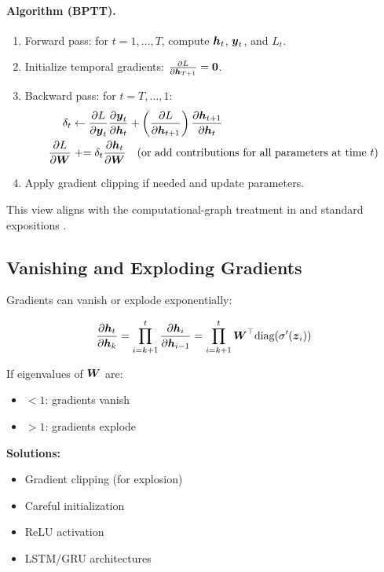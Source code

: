 \paragraph{Algorithm (BPTT).}
\begin{enumerate}[nosep]
    \item Forward pass: for $t=1,\dots,T$, compute $\boldsymbol{h}_t$, $\boldsymbol{y}_t$, and $L_t$.
    \item Initialize temporal gradients: $\frac{\partial L}{\partial \boldsymbol{h}_{T+1}}=\boldsymbol{0}$.
    \item Backward pass: for $t=T,\dots,1$:
    \begin{align*}
        \delta_t &\leftarrow \frac{\partial L}{\partial \boldsymbol{y}_t} \frac{\partial \boldsymbol{y}_t}{\partial \boldsymbol{h}_t} + \left(\frac{\partial L}{\partial \boldsymbol{h}_{t+1}}\right) \frac{\partial \boldsymbol{h}_{t+1}}{\partial \boldsymbol{h}_t} \\
        \frac{\partial L}{\partial \boldsymbol{W}} &\mathrel{+}= \delta_t \frac{\partial \boldsymbol{h}_t}{\partial \boldsymbol{W}} \quad (\text{or add contributions for all parameters at time } t)
    \end{align*}
    \item Apply gradient clipping if needed and update parameters.
\end{enumerate}

This view aligns with the computational-graph treatment in \cite{GoodfellowEtAl2016} and standard expositions \cite{WebDLBRNN,D2LChapterRNN}.

\subsection{Vanishing and Exploding Gradients}

Gradients can vanish or explode exponentially:

\begin{equation}
\frac{\partial \boldsymbol{h}_t}{\partial \boldsymbol{h}_k} = \prod_{i=k+1}^{t} \frac{\partial \boldsymbol{h}_i}{\partial \boldsymbol{h}_{i-1}} = \prod_{i=k+1}^{t} \boldsymbol{W}^\top \text{diag}(\sigma'(\boldsymbol{z}_i))
\end{equation}

If eigenvalues of $\boldsymbol{W}$ are:
\begin{itemize}
    \item $< 1$: gradients vanish
    \item $> 1$: gradients explode
\end{itemize}

\textbf{Solutions:}
\begin{itemize}
    \item Gradient clipping (for explosion) 
    \item Careful initialization
    \item ReLU activation
    \item LSTM/GRU architectures
\end{itemize}

